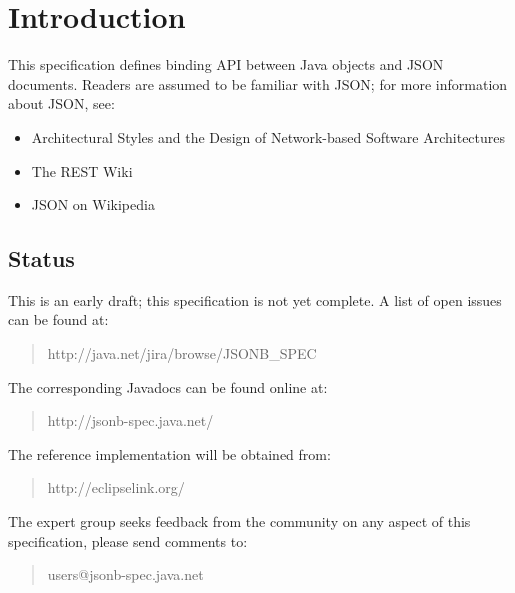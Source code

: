 \chapter{Introduction}

This specification defines binding API between Java objects and JSON \cite{json} documents. Readers are assumed to be familiar with JSON; for more information about JSON, see:

\begin{itemize}
\item Architectural Styles and the Design of Network-based Software Architectures\cite{rest}
\item The REST Wiki\cite{restwiki}
\item JSON on Wikipedia\cite{jsonwikipedia}
\end{itemize}

\section{Status}
\label{status}

This is an early draft; this specification is not yet complete. A list of open issues can be found at:


\begin{quote}
http://java.net/jira/browse/JSONB\_SPEC
\end{quote}

The corresponding Javadocs can be found online at:

\begin{quote}
http://jsonb-spec.java.net/
\end{quote}

The reference implementation will be obtained from:

\begin{quote}
http://eclipselink.org/
\end{quote}

The expert group seeks feedback from the community on any aspect of this specification, please send comments to:

\begin{quote}
users@jsonb-spec.java.net
\end{quote}

